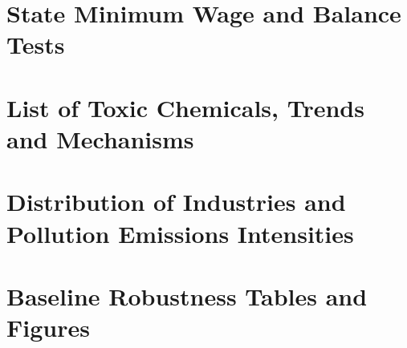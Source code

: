 \documentclass[12pt, english]{article}
\begin{document}
    \newpage
    \begin{appendices}
        \renewcommand\thesection{\Roman{section}} %
        \renewcommand\thesubsection{\Alph{subsection}} %


        \section{State Minimum Wage and Balance Tests}\label{sec:appendix-state-minimum-wage-and-balance-tests}
        
        
        
        
        


        \section{List of Toxic Chemicals, Trends and Mechanisms}\label{sec:appendix-list-of-toxic-chemicals-trends-and-mechanisms}
        
        
        
        
        
        
        


        \section{Distribution of Industries and Pollution Emissions Intensities}\label{sec:appendix-distribution-of-industries-and-pollution-emissions-intensities}
        
        
        
        
        
        
        
        
        
        
        
        
        


        \section{Baseline Robustness Tables and Figures}\label{sec:appendix-baseline-robustness-tables-and-figures}
        
        
        


    \end{appendices}
\end{document}
